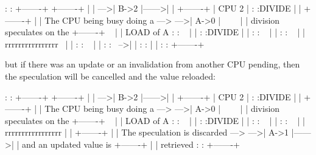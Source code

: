 \begin{VerbatimU}
	                                        :       :       +-------+
	                                        +-------+       |       |
	                                    --->| B->2  |------>|       |
	                                        +-------+       | CPU 2 |
	                                        :       :DIVIDE |       |
	                                        +-------+       |       |
	The CPU being busy doing a --->     --->| A->0  |~~~~   |       |
	division speculates on the              +-------+   ~   |       |
	LOAD of A                               :       :   ~   |       |
	                                        :       :DIVIDE |       |
	                                        :       :   ~   |       |
	                                        :       :   ~   |       |
	                                    rrrrrrrrrrrrrrrr~   |       |
	                                        :       :   ~   |       |
	                                        :       :   ~-->|       |
	                                        :       :       |       |
	                                        :       :       +-------+
\end{VerbatimU}

but if there was an update or an invalidation from another CPU pending, then
the speculation will be cancelled and the value reloaded:

\begin{VerbatimU}
	                                        :       :       +-------+
	                                        +-------+       |       |
	                                    --->| B->2  |------>|       |
	                                        +-------+       | CPU 2 |
	                                        :       :DIVIDE |       |
	                                        +-------+       |       |
	The CPU being busy doing a --->     --->| A->0  |~~~~   |       |
	division speculates on the              +-------+   ~   |       |
	LOAD of A                               :       :   ~   |       |
	                                        :       :DIVIDE |       |
	                                        :       :   ~   |       |
	                                        :       :   ~   |       |
	                                    rrrrrrrrrrrrrrrrr   |       |
	                                        +-------+       |       |
	The speculation is discarded --->   --->| A->1  |------>|       |
	and an updated value is                 +-------+       |       |
	retrieved                               :       :       +-------+
\end{VerbatimU}


